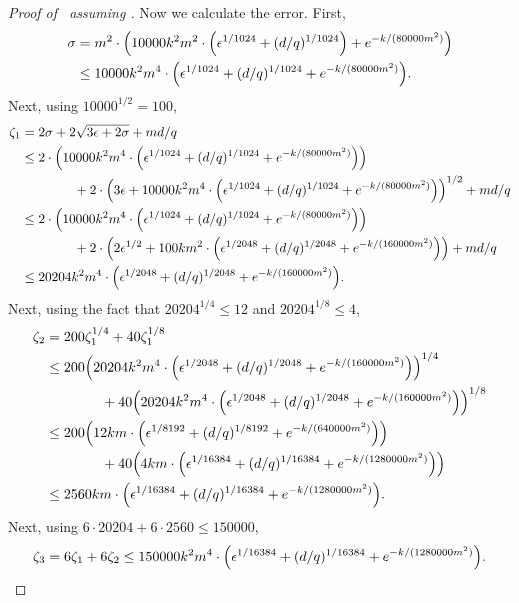 \begin{proof}[Proof of~ assuming ]
Now we calculate the error.
First,
\begin{align*}
\sigma
&= m^2\cdot\left(10000 k^2 m^2 \cdot \Big(\epsilon^{1/1024} +  (d/q)^{1/1024}\Big) + e^{-k/(80000m^2)}\right)\\
&\leq 10000 k^2 m^4 \cdot \Big(\epsilon^{1/1024} +  (d/q)^{1/1024} + e^{-k/(80000m^2)}\Big).
\end{align*}
Next, using $10000^{1/2} = 100$,
\begin{align*}
\zeta_1 &= 2\sigma + 2\sqrt{3\epsilon + 2\sigma} + md/q\\
& \leq 2\cdot\Big(10000 k^2 m^4 \cdot \Big(\epsilon^{1/1024} +  (d/q)^{1/1024} + e^{-k/(80000m^2)}\Big)\Big)\\
&		\qquad\qquad+ 2\cdot \Big( 3 \epsilon + 10000 k^2 m^4 \cdot \Big(\epsilon^{1/1024} +  (d/q)^{1/1024} + e^{-k/(80000m^2)}\Big)\Big)^{1/2} + md/q\\
& \leq 2\cdot\Big(10000 k^2 m^4 \cdot \Big(\epsilon^{1/1024} +  (d/q)^{1/1024} + e^{-k/(80000m^2)}\Big)\Big)\\
&		\qquad\qquad+ 2\cdot \Big( 2 \epsilon^{1/2} + 100 k m^2 \cdot \Big(\epsilon^{1/2048} +  (d/q)^{1/2048} + e^{-k/(160000m^2)}\Big)\Big) + md/q\\
& \leq 20204 k^2 m^4 \cdot \Big(\epsilon^{1/2048} +  (d/q)^{1/2048} + e^{-k/(160000m^2)}\Big).
\end{align*}
Next, using the fact that $20204^{1/4} \leq 12$ and $20204^{1/8} \leq 4$,
\begin{align*}
\zeta_2
&= 200\zeta_1^{1/4} + 40\zeta_1^{1/8}\\
& \leq 200 \Big(20204 k^2 m^4 \cdot \Big(\epsilon^{1/2048} +  (d/q)^{1/2048} + e^{-k/(160000m^2)}\Big)\Big)^{1/4}\\
&		\qquad\qquad+ 40 \Big(20204 k^2 m^4 \cdot \Big(\epsilon^{1/2048} +  (d/q)^{1/2048} + e^{-k/(160000m^2)}\Big)\Big)^{1/8}\\
& \leq 200 \Big(12 k m \cdot \Big(\epsilon^{1/8192} +  (d/q)^{1/8192} + e^{-k/(640000m^2)}\Big)\Big)\\
&		\qquad\qquad+ 40 \Big(4 k m
		\cdot \Big(\epsilon^{1/16384} +  (d/q)^{1/16384} + e^{-k/(1280000m^2)}\Big)\Big)\\
& \leq 2560 km \cdot \Big(\epsilon^{1/16384} + (d/q)^{1/16384} + e^{-k/(1280000m^2)}\Big).
\end{align*}
Next, using $6\cdot 20204 + 6 \cdot 2560 \leq 150000$,
\begin{equation*}
\zeta_3 = 6 \zeta_1 + 6 \zeta_2
\leq 150000 k^2 m^4 \cdot \Big(\epsilon^{1/16384} + (d/q)^{1/16384} + e^{-k/(1280000m^2)}\Big).
\end{equation*}

\end{proof}
